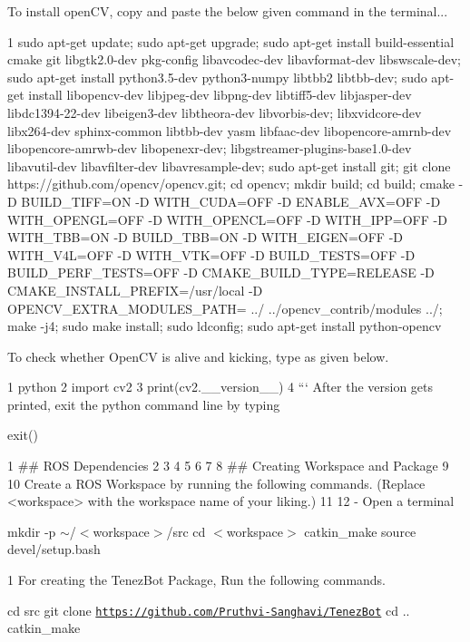\begin{DoxyItemize}
\item To install open\+CV, copy and paste the below given command in the terminal... 
\begin{DoxyCode}
1 sudo apt-get update; sudo apt-get upgrade; sudo apt-get install build-essential cmake git libgtk2.0-dev
       pkg-config libavcodec-dev libavformat-dev libswscale-dev; sudo apt-get install python3.5-dev python3-numpy
       libtbb2 libtbb-dev; sudo apt-get install libopencv-dev libjpeg-dev libpng-dev libtiff5-dev libjasper-dev
       libdc1394-22-dev libeigen3-dev libtheora-dev libvorbis-dev; libxvidcore-dev libx264-dev sphinx-common libtbb-dev
       yasm libfaac-dev libopencore-amrnb-dev libopencore-amrwb-dev libopenexr-dev; libgstreamer-plugins-base1.0-dev
       libavutil-dev libavfilter-dev libavresample-dev; sudo apt-get install git; git clone
       https://github.com/opencv/opencv.git; cd opencv; mkdir build; cd build; cmake -D BUILD\_TIFF=ON -D WITH\_CUDA=OFF -D ENABLE\_AVX=OFF
       -D WITH\_OPENGL=OFF -D WITH\_OPENCL=OFF -D WITH\_IPP=OFF -D WITH\_TBB=ON -D BUILD\_TBB=ON -D WITH\_EIGEN=OFF -D
       WITH\_V4L=OFF -D WITH\_VTK=OFF -D BUILD\_TESTS=OFF -D BUILD\_PERF\_TESTS=OFF -D CMAKE\_BUILD\_TYPE=RELEASE -D
       CMAKE\_INSTALL\_PREFIX=/usr/local -D OPENCV\_EXTRA\_MODULES\_PATH= ../ ../opencv\_contrib/modules ../; make -j4; sudo make
       install; sudo ldconfig; sudo apt-get install python-opencv
\end{DoxyCode}
 To check whether Open\+CV is alive and kicking, type as given below. 
\begin{DoxyCode}
1 python
2 import cv2
3 print(cv2.\_\_version\_\_)
4 ``` After the version gets printed, exit the python command line by typing
\end{DoxyCode}
 exit() 
\begin{DoxyCode}
1 ## ROS Dependencies
2 
3 
4 
5 
6 
7 
8 ## Creating Workspace and Package
9 
10 Create a ROS Workspace by running the following commands. (Replace <workspace> with the workspace name of
       your liking.)
11 
12 - Open a terminal
\end{DoxyCode}
 mkdir -\/p $\sim$/$<$workspace$>$/src cd $<$workspace$>$ catkin\+\_\+make source devel/setup.\+bash 
\begin{DoxyCode}
1 For creating the TenezBot Package, Run the following commands. 
\end{DoxyCode}
 cd src git clone \href{https://github.com/Pruthvi-Sanghavi/TenezBot}{\tt https\+://github.\+com/\+Pruthvi-\/\+Sanghavi/\+Tenez\+Bot} cd .. catkin\+\_\+make 

\end{DoxyItemize}
